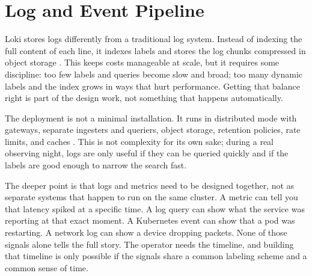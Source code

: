 \section{Log and Event Pipeline}

Loki stores logs differently from a traditional log system. Instead of indexing the full content
of each line, it indexes labels and stores the log chunks compressed in object storage
\cite{grafana-loki}. This keeps costs manageable at scale, but it requires some discipline: too
few labels and queries become slow and broad; too many dynamic labels and the index grows in ways
that hurt performance. Getting that balance right is part of the design work, not something that
happens automatically.

The deployment is not a minimal installation. It runs in distributed mode with gateways, separate
ingesters and queriers, object storage, retention policies, rate limits, and caches
\cite{lsst-it-k8s-cookbook}. This is not complexity for its own sake; during a real observing
night, logs are only useful if they can be queried quickly and if the labels are good enough to
narrow the search fast.

The deeper point is that logs and metrics need to be designed together, not as separate systems
that happen to run on the same cluster. A metric can tell you that latency spiked at a specific
time. A log query can show what the service was reporting at that exact moment. A Kubernetes event
can show that a pod was restarting. A network log can show a device dropping packets. None of those
signals alone tells the full story. The operator needs the timeline, and building that timeline is
only possible if the signals share a common labeling scheme and a common sense of time.

